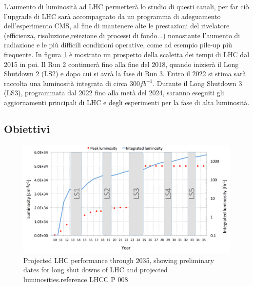 L'aumento di luminosità ad LHC permetterà lo studio di questi canali, per far ciò  l'upgrade di LHC sarà accompagnato da un programma di adeguamento dell'esperimento CMS, al fine di mantenere alte le prestazioni del rivelatore (efficienza, risoluzione,reiezione di processi di fondo...) nonostante l'aumento di radiazione e le più difficili condizioni operative, come ad esempio pile-up più frequente.
In figura \ref{HL-LHC} è mostrato un prospetto della scaletta dei tempi di LHC dal 2015 in poi. Il Run 2 continuerà fino alla fine del 2018, quando inizierà il Long Shutdown 2 (LS2) e dopo cui si avrà la fase di Run 3.  Entro il 2022 si stima sarà raccolta una luminosità integrata di circa $300 fb^{-1}$. 
Durante il Long Shutdown 3 (LS3), programmata dal 2022 fino alla metà del 2024, saranno eseguiti gli aggiornamenti principali di LHC e degli esperimenti per la fase di alta luminosità.

\subsection{Obiettivi}
\begin{figure}
\centering
\includegraphics[scale=.35]{Immagini/HL-LHC}
\caption{Projected LHC performance through 2035, showing preliminary dates for long shut downs of LHC and projected luminosities.reference LHCC P 008}
\label{HL-LHC}
\end{figure}

